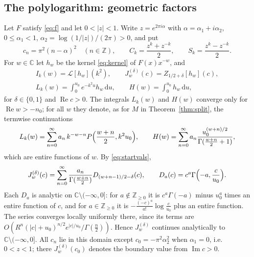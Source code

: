 \documentclass[11pt,reqno]{amsart}
\theoremstyle{definition}
\theoremstyle{remark}
\newcommand{\dd}{\,\mathrm{d}}
\newcommand{\ZZ}{\mathbb{Z}}
\newcommand{\CC}{\mathbb{C}}
\begin{document}
\subsection{The polylogarithm: geometric factors}\label{sec:geometric}
Let $F$ satisfy \eqref{eq:f} and let $0 < |z| < 1$. Write $z = e^{2\pi i\alpha}$ with $\alpha = \alpha_1 + i\alpha_2$,
$0 \le \alpha_1 < 1$, $\alpha_2 = \log(1/|z|)/(2\pi) > 0$, and put
\[
  c_n = \pi^2(n-\alpha)^2 \quad (n \in \ZZ), \qquad C_k = \frac{z^k + z^{-k}}2, \qquad S_k = \frac{z^k - z^{-k}}2.
\]
For $w \in \CC$ let $h_w$ be the kernel \eqref{eq:kernel} of $F(x)x^{-w}$, and
\begin{gather*}
  I_k(w) = \mathcal L[h_w](k^2), \qquad J^{(\delta)}_w(c) = Z_{1/2+\delta}[h_w](c), \\
  L_k(w) = \int_0^{u_0}e^{-k^2u}h_w\dd u, \qquad H(w) = \int_0^{u_0}h_w\dd u,
\end{gather*}
for $\delta \in \{0,1\}$ and $\operatorname{Re}c > 0$. The integrals $L_k(w)$ and $H(w)$ converge only for
$\operatorname{Re}w > -n_0$; for all $w$ they denote, as for $M$ in Theorem~\ref{thm:split}, the termwise
continuations
\[
  L_k(w) = \sum_{n=0}^{\infty}a_n\,k^{-w-n}P\Bigl(\frac{w+n}2, k^2u_0\Bigr), \qquad
  H(w) = \sum_{n=0}^{\infty}a_n\frac{u_0^{(w+n)/2}}{\Gamma(\frac{w+n}2+1)},
\]
which are entire functions of $w$. By \eqref{eq:startvals},
\[
  J^{(\delta)}_w(c) = \sum_{n=0}^{\infty}\frac{a_n}{\Gamma(\frac{w+n}2)}D_{(w+n-1)/2-\delta}(c), \qquad
  D_a(c) = c^a\Gamma\Bigl(-a, \frac c{u_0}\Bigr).
\]
Each $D_a$ is analytic on $\CC\setminus(-\infty,0]$: for $a \notin \ZZ_{\ge0}$ it is $c^a\Gamma(-a)$ minus $u_0^a$ times an entire function of $c$, and for $a \in \ZZ_{\ge0}$ it is $-\frac{(-c)^a}{a!}\log\frac c{u_0}$ plus an entire function. The series converges locally uniformly there, since its terms are
$O(R^n(|c|+u_0)^{n/2}e^{|c|/u_0}/\Gamma(\frac n2))$. Hence $J^{(\delta)}_w$ continues analytically to
$\CC\setminus(-\infty,0]$. All $c_n$ lie in this domain except $c_0 = -\pi^2\alpha_2^2$ when $\alpha_1 = 0$, i.e.\
$0 < z < 1$; there $J^{(\delta)}_w(c_0)$ denotes the boundary value from $\operatorname{Im}c > 0$.
\end{document}
